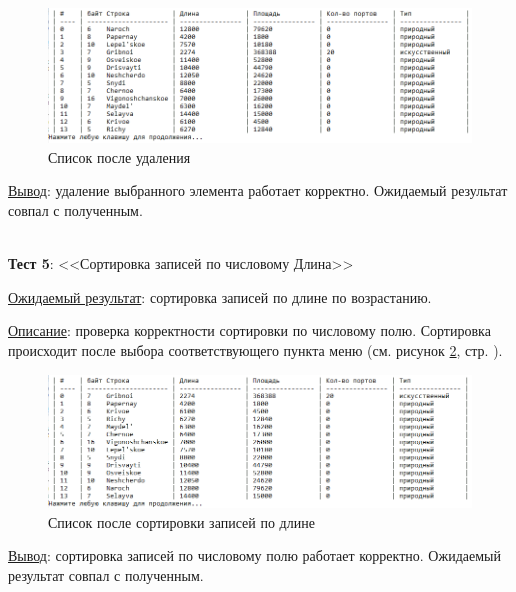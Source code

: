 
\begin{figure}[!hp]
    \begin{center}
        \includegraphics[width=16cm]{_input/tests/data-tsv-4.png}
    \end{center}
    \caption{Список после удаления\label{fig:data_tsv_4}}
\end{figure}

\underline{Вывод}: удаление выбранного элемента работает корректно. Ожидаемый результат совпал с полученным.

\hspace{0pt}\\



\textbf{Тест 5}: <<Сортировка записей по числовому Длина>>

\underline{Ожидаемый результат}: сортировка записей по длине по возрастанию.

\underline{Описание}: проверка корректности сортировки по числовому полю. Сортировка происходит после выбора соответствующего пункта меню (см. рисунок \ref{fig:data_tsv_5}, стр. \pageref{fig:data_tsv_5}).


\begin{figure}[!hp]
    \begin{center}
        \includegraphics[width=16cm]{_input/tests/data-tsv-5.png}
    \end{center}
    \caption{Список после сортировки записей по длине\label{fig:data_tsv_5}}
\end{figure}

\underline{Вывод}: сортировка записей по числовому полю работает корректно. Ожидаемый результат совпал с полученным.